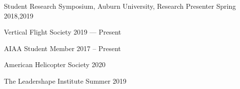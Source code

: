 Student Research Symposium, Auburn University, Research Presenter	\hfill Spring 2018,2019

Vertical Flight Society	\hfill 2019 --- Present

AIAA Student Member \hfill 2017 -- Present

American Helicopter Society	\hfill 2020

The Leadershape Institute	\hfill Summer 2019



